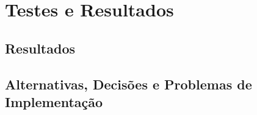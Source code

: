 \chapter{Testes e Resultados}
\label{cap:testes}


\section{Resultados}
\label{sec:resultados:testes}

\section{Alternativas, Decisões e Problemas de Implementação}
\label{sec:alternativas:testes}



